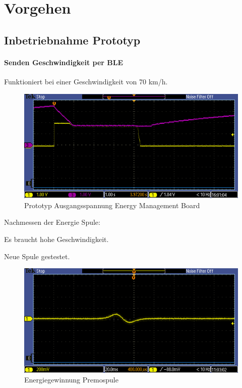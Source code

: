 \chapter{Vorgehen}

\section{Inbetriebnahme Prototyp}

\subsubsection{Senden Geschwindigkeit per BLE}
Funktioniert bei einer Geschwindigkeit von 70 km/h. 

\begin{figure}[h!]
\includegraphics[bb=0 240 50 50]{EnergieSenden.PNG}
\caption{Prototyp Ausgangsspannung Energy Management Board}
\end{figure}

\newpage 

Nachmessen der Energie Spule:

Es braucht hohe Geschwindigkeit.

Neue Spule gestestet.


\begin{figure}[h]
\includegraphics[bb=0 100 50 50]{PremoSpule.PNG}
\caption{Energiegewinnung Premospule}
\end{figure}

